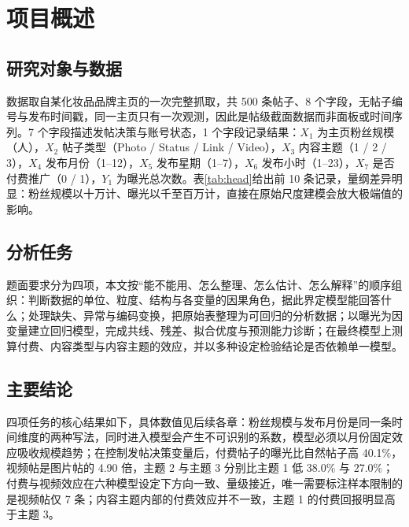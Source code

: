 \section{项目概述}

\subsection{研究对象与数据}

数据取自某化妆品品牌主页的一次完整抓取，共 500 条帖子、8 个字段，无帖子编号与发布时间戳，同一主页只有一次观测，因此是帖级截面数据而非面板或时间序列。7 个字段描述发帖决策与账号状态，1 个字段记录结果：$X_1$ 为主页粉丝规模（人），$X_2$ 帖子类型（Photo / Status / Link / Video），$X_3$ 内容主题（1 / 2 / 3），$X_4$ 发布月份（1--12），$X_5$ 发布星期（1--7），$X_6$ 发布小时（1--23），$X_7$ 是否付费推广（0 / 1），$Y_1$ 为曝光总次数。表\ref{tab:head}给出前 10 条记录，量纲差异明显：粉丝规模以十万计、曝光以千至百万计，直接在原始尺度建模会放大极端值的影响。



\subsection{分析任务}

题面要求分为四项，本文按“能不能用、怎么整理、怎么估计、怎么解释”的顺序组织：判断数据的单位、粒度、结构与各变量的因果角色，据此界定模型能回答什么；处理缺失、异常与编码变换，把原始表整理为可回归的分析数据；以曝光为因变量建立回归模型，完成共线、残差、拟合优度与预测能力诊断；在最终模型上测算付费、内容类型与内容主题的效应，并以多种设定检验结论是否依赖单一模型。

\subsection{主要结论}

四项任务的核心结果如下，具体数值见后续各章：粉丝规模与发布月份是同一条时间维度的两种写法，同时进入模型会产生不可识别的系数，模型必须以月份固定效应吸收规模趋势；在控制发帖决策变量后，付费帖子的曝光比自然帖子高 40.1\%，视频帖是图片帖的 4.90 倍，主题 2 与主题 3 分别比主题 1 低 38.0\% 与 27.0\%；付费与视频效应在六种模型设定下方向一致、量级接近，唯一需要标注样本限制的是视频帖仅 7 条；内容主题内部的付费效应并不一致，主题 1 的付费回报明显高于主题 3。

